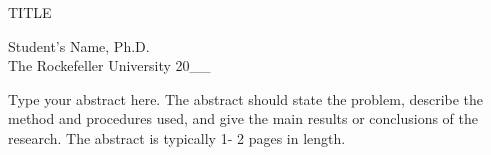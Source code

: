 \begin{center}
\thispagestyle{empty}
TITLE %
\begin{singlespace}
Student's Name, Ph.D.\\ %
The Rockefeller University 20\_\_ %
\end{singlespace}
\end{center}
\hspace{10mm}
Type your abstract here. The abstract should state the problem, describe the method and procedures used, and give the main results or conclusions of the research. The abstract is typically 1- 2 pages in length.
\vspace*{\fill}
